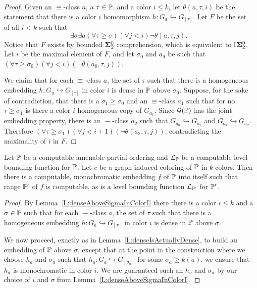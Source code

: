 \begin{proof}
Given an $\equiv$-class $a$, a $\tau\in\mathbb{P}$, and a color $i\leq k$,
let $\theta(a,\tau,i)$ be the statement that there is a color $i$
homomorphism $h:G_a\hookrightarrow G_{[\tau]}$.
Let $F$ be the set of all $i<k$ such that
$$\exists\sigma\exists a(\forall\tau\geq\sigma)(\forall j< i)\neg\theta(a,\tau,j).$$
Notice that $F$ exists by bounded $\mathbf{\Sigma}^0_2$ comprehension, which is equivalent to I$\mathbf{\Sigma}^0_2$.
Let $i$ be the maximal element of $F$, and let $\sigma_0$ and $a_0$ be such that
$(\forall\tau\geq\sigma_0)(\forall j<i)(\neg\theta(a_0,\tau,j))$.

We claim that for each $\equiv$-class $a$,
the set of $\tau$ such that there is a homogeneous embedding
$h:G_a\hookrightarrow G_{[\tau]}$ in color $i$ is dense in $\mathbb{P}$ above $\sigma_0$.
Suppose, for the sake of contradiction, that there is a $\sigma_1\geq\sigma_0$
and an $\equiv$-class $a_1$ such that for no $\tau\geq\sigma_1$ is there a color
$i$ homogeneous copy of $G_{a_1}$.
Since $\mathcal{G}(\mathbb{P})$ has the joint embedding property, there is an $\equiv$-class $a_2$ such that
$G_{a_0}\hookrightarrow G_{a_2}$ and $G_{a_1}\hookrightarrow G_{a_2}$.
Therefore $(\forall\tau\geq\sigma_1)(\forall j<i+1)(\neg\theta(a_2,\tau,j))$,
contradicting the maximality of $i$ in $F$.
\end{proof}

\begin{lem}\label{L:GraphInducedColoringSolutions}
Let $\mathbb{P}$ be a computable amenable partial ordering and $\mathcal{L}_{\mathbb{P}}$ be a computable level bounding function for $\mathbb{P}$.
Let $c$ be a graph induced coloring of $\mathbb{P}$ in $k$ colors.
Then there is a computable, monochromatic embedding $f$ of $\mathbb{P}$ into itself such that
range $\mathbb{P}'$ of $f$ is computable, as is a level bounding function $\mathcal{L}_{\mathbb{P}'}$ for $\mathbb{P}'$.
\end{lem}

\begin{proof}
By Lemma~\ref{L:denseAboveSigmaInColorI}
there there is a color $i\leq k$ and a $\sigma\in\mathbb{P}$ such that for each $\equiv$-class $a$,
the set of $\tau$ such that there is a homogeneous embedding
$h:G_a\hookrightarrow G_{[\tau]}$ in color $i$ is dense in $\mathbb{P}$ above $\sigma$.

We now proceed, exactly as in Lemma~\ref{L:denseIsActuallyDense}, to build an embedding of
$\mathbb{P}$ above $\sigma$, except that at the point in the construction where we choose $h_a$ and $\sigma_a$
such that $h_{a}:G_{a}\hookrightarrow G_{[\sigma_a]}$ for some $\sigma_a\geq k(a)$,
we ensure that $h_a$ is monochromatic in color $i$.
We are guaranteed such an $h_a$ and $\sigma_a$ by our choice of $i$ and $\sigma$ from Lemma~\ref{L:denseAboveSigmaInColorI}.
\end{proof}

